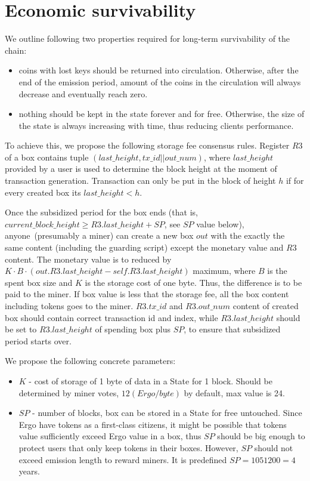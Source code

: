 \section{Economic survivability}

We outline following two properties required for long-term survivability of the chain:

\begin{itemize}
    \item{} coins with lost keys should be returned into circulation.
    Otherwise, after the end of the emission period, amount of the coins
    in the circulation will always decrease and eventually reach zero.
    \item{} nothing should be kept in the state forever and for free.
    Otherwise, the size of the state is always increasing with time, thus reducing clients performance.
\end{itemize}

To achieve this, we propose the following storage fee consensus rules.
Register $R3$ of a box contains tuple $(last\_height, tx\_id || out\_num)$, where $last\_height$ provided by a user
is used to determine the block height at the moment of transaction generation.
Transaction can only be put in the block of height $h$ if for every created box its $last\_height < h$.

Once the subsidized period for the box ends (that is,
$current\_block\_height \ge R3.last\_height + SP$, see $SP$ value below), anyone~(presumably a miner) can
create a new box $out$ with the exactly the same content (including the guarding
script) except the monetary value and $R3$ content. The monetary value is to 
reduced by $K \cdot B \cdot (out.R3.last\_height - self.R3.last\_height)$ maximum, where $B$ is the spent box size and $K$ is the storage cost of one byte.
Thus, the difference is to be paid to the miner.
If box value is less that the storage fee, all the box content including tokens goes to the miner.
$R3.tx\_id$ and $R3.out\_num$ content of created box should contain correct transaction id
and index, while $R3.last\_height$ should be set to $R3.last\_height$ of spending box
plus $SP$, to ensure that subsidized period starts over.

We propose the following concrete parameters:
\begin{itemize}
    \item{} $K$ - cost of storage of 1 byte of data in a State for 1 block.
    Should be determined by miner votes, $12 (Ergo/byte)$ by default, max value is 24.
    \item{} $SP$ - number of blocks, box can be stored in a State for free untouched.
    Since Ergo have tokens as a first-class citizens, it might be possible that tokens value
    sufficiently exceed Ergo value in a box, thus $SP$ should be big enough to protect users
    that only keep tokens in their boxes.
    However, $SP$ should not exceed emission length to reward miners.
    It is predefined $SP = 1051200 = 4$ years.
\end{itemize}